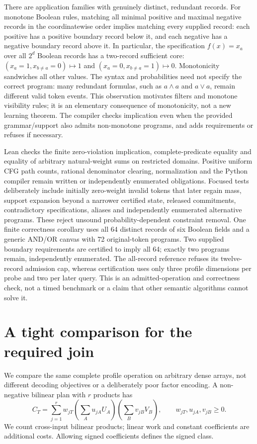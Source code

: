 \documentclass[11pt,a4paper]{article}
\begin{document}
There are application families with genuinely distinct, redundant records.
For monotone Boolean rules, matching all minimal positive and maximal negative
records in the coordinatewise order implies matching every supplied record:
each positive has a positive boundary record below it, and each negative has
a negative boundary record above it. In particular, the specification
$f(x)=x_a$ over all $2^d$ Boolean records has a two-record sufficient core:
$(x_a=1,x_{b\ne a}=0)\mapsto1$ and
$(x_a=0,x_{b\ne a}=1)\mapsto0$. Monotonicity sandwiches all other values.
The syntax and probabilities need not specify the correct program: many
redundant formulas, such as $a\land a$ and $a\lor a$, remain different valid
token events. This observation motivates filters and monotone visibility rules;
it is an elementary consequence of monotonicity, not a new learning theorem.
The compiler checks implication even when the provided grammar/support also
admits non-monotone programs, and adds requirements or refuses if necessary.

Lean checks the finite zero-violation implication, complete-predicate equality
and equality of arbitrary natural-weight sums on restricted domains. Positive
uniform CFG path counts, rational denominator clearing, normalization and the
Python compiler remain written or independently enumerated obligations.
Focused tests deliberately include initially zero-weight invalid tokens that
later regain mass, support expansion beyond a narrower certified state,
released commitments, contradictory specifications, aliases and independently
enumerated alternative programs. These reject unsound probability-dependent
constraint removal.
One finite correctness corollary uses all 64 distinct records of six Boolean
fields and a generic AND/OR canvas with 72 original-token programs. Two supplied
boundary requirements are certified to imply all 64; exactly two programs
remain, independently enumerated. The all-record reference refuses its
twelve-record admission cap, whereas certification uses only three profile
dimensions per probe and two per later query. This is an admitted-operation
and correctness check, not a timed benchmark or a claim that other semantic
algorithms cannot solve it.

\section{A tight comparison for the required join}
We compare the same complete profile operation on arbitrary dense arrays,
not different decoding objectives or a deliberately poor factor encoding.
A non-negative bilinear plan with $r$ products has
\[
 C_T=\sum_{j=1}^r w_{jT}
       \left(\sum_Au_{jA}U_A\right)\left(\sum_Bv_{jB}V_B\right),
 \qquad w_{jT},u_{jA},v_{jB}\geq0.
\]
We count cross-input bilinear products; linear work and constant coefficients
are additional costs. Allowing signed coefficients defines the signed class.
\end{document}

